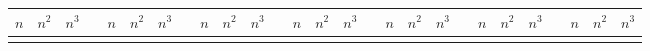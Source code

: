 \documentclass[12pt]{article}
\begin{document}
\centering
\small
\setlength{\tabcolsep}{2.5pt}
\renewcommand{\arraystretch}{0.75}

\begin{tabular}{>{\bfseries}r r r !{\vrule width 0.4pt} c >{\bfseries}r r r !{\vrule width 0.4pt} c >{\bfseries}r r r !{\vrule width 0.4pt} c >{\bfseries}r r r !{\vrule width 0.4pt} c >{\bfseries}r r r !{\vrule width 0.4pt} c >{\bfseries}r r r !{\vrule width 0.4pt} c >{\bfseries}r r r}
    \toprule
    \textcolor{Primary}{$n$} & \textcolor{Primary}{$n^2$} & \textcolor{Primary}{$n^3$} & &
    \textcolor{Primary}{$n$} & \textcolor{Primary}{$n^2$} & \textcolor{Primary}{$n^3$} & &
    \textcolor{Primary}{$n$} & \textcolor{Primary}{$n^2$} & \textcolor{Primary}{$n^3$} & &
    \textcolor{Primary}{$n$} & \textcolor{Primary}{$n^2$} & \textcolor{Primary}{$n^3$} & &
    \textcolor{Primary}{$n$} & \textcolor{Primary}{$n^2$} & \textcolor{Primary}{$n^3$} & &
    \textcolor{Primary}{$n$} & \textcolor{Primary}{$n^2$} & \textcolor{Primary}{$n^3$} & &
    \textcolor{Primary}{$n$} & \textcolor{Primary}{$n^2$} & \textcolor{Primary}{$n^3$} \\
    \midrule


    \bottomrule
\end{tabular}
\end{document}
